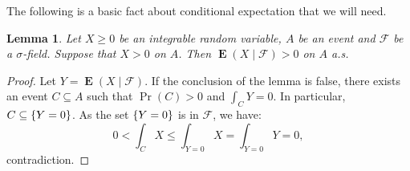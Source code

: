 \documentclass[JEP,XML,SOM,Unicode,published]{cedram}
\let\mathcal\mathscr
\let\sub\subseteq
\theoremstyle{plain}
\newtheorem{lemma}[theorem]{Lemma}
\theoremstyle{definition}
\newcommand{\cF}{\mathcal{F}}
\DeclareMathOperator{\E}{\mathbf{E}}
\DeclarePairedDelimiter\set{\{}{\}}
\begin{document}
The following is a basic fact about conditional expectation that we will need.
\begin{lemma}
\label{l:strictly-positive}
Let $X \geq 0$ be an integrable random variable, $A$ be an event and $\cF$ be a $\sigma$-field. Suppose that $X > 0$ on $A$. Then $\E(X \mid \cF) > 0$ on $A$ a.s.
\end{lemma}
\begin{proof}
Let $Y = \E(X \mid \cF)$. If the conclusion of the lemma is false, there exists an event $C \sub A$ such that $\Pr(C) > 0$ and $\int_C Y = 0$. In particular, $C \sub \set{Y = 0}$. As the set $\set{Y = 0}$ is in $\cF$, we have:
\begin{equation*}
0 < \int_C X \leq \int_{Y = 0} X = \int_{Y = 0} Y = 0,
\end{equation*}
contradiction.
\end{proof}
\end{document}
